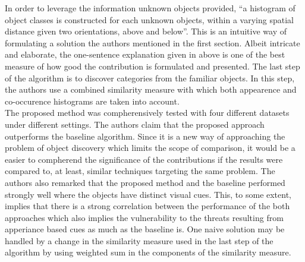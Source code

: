 \documentclass[11pt]{article}
\begin{document}
In order to leverage the information unknown objects provided, ``a histogram of object classes is constructed for each unknown objects, within a varying spatial distance given two orientations, above and below''.
This is an intuitive way of formulating a solution the authors mentioned in the first section.
Albeit intricate and elaborate, the one-sentence explanation given in above is one of the best measure of how good the contribution is formulated and presented.
The last step of the algorithm is to discover categories from the familiar objects.
In this step, the authors use a combined similarity measure with which both appearence and co-occurence histograms are taken into account.\\
\indent The proposed method was compherensively tested with four different datasets under different settings.
The authors claim that the proposed approach outperforms the baseline algorithm.
Since it is a new way of approaching the problem of object discovery which limits the scope of comparison, it would be a easier to compherend the significance of the contributions if the results were compared to, at least, similar techniques targeting the same problem.
The authors also remarked that the proposed method and the baseline performed strongly well where the objects have distinct visual cues.
This, to some extent, implies that there is a strong correlation between the performance of the both approaches which also implies the vulnerability to the threats resulting from apperiance based cues as much as the baseline is.
One naive solution may be handled by a change in the similarity measure used in the last step of the algorithm by using weighted sum in the components of the similarity measure.
% 
% 
\end{document}
